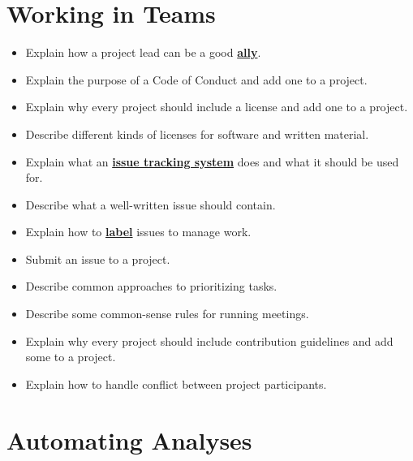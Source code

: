 \documentclass[
]{krantz}
\providecommand{\tightlist}{%
  \setlength{\itemsep}{0pt}\setlength{\parskip}{0pt}}
\newcommand{\gref}[2]{\hyperlink{#2}{\textbf{#1}}}
\begin{document}
\hypertarget{working-in-teams}{%
\section{Working in Teams}\label{working-in-teams}}

\begin{itemize}
\tightlist
\item
  Explain how a project lead can be a good \gref{ally}{ally}.
\item
  Explain the purpose of a Code of Conduct and add one to a project.
\item
  Explain why every project should include a license and add one to a project.
\item
  Describe different kinds of licenses for software and written material.
\item
  Explain what an \gref{issue tracking system}{issue\_tracking\_system} does and what it should be used for.
\item
  Describe what a well-written issue should contain.
\item
  Explain how to \gref{label}{issue\_label} issues to manage work.
\item
  Submit an issue to a project.
\item
  Describe common approaches to prioritizing tasks.
\item
  Describe some common-sense rules for running meetings.
\item
  Explain why every project should include contribution guidelines and add some to a project.
\item
  Explain how to handle conflict between project participants.
\end{itemize}

\hypertarget{automating-analyses}{%
\section{Automating Analyses}\label{automating-analyses}}
\end{document}
